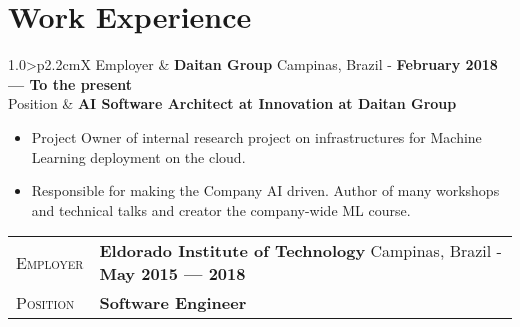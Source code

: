 \documentclass[9pt, a4paper, oneside, final]{scrartcl} %
\newcommand{\gray}{\rowcolor[gray]{.90}} %
\begin{document}


\section{Work Experience}

\begin{center}
\begin{tabularx}{1.0\linewidth}{>{\raggedleft\scshape}p{2.2cm}X}
\gray Employer & \textbf{Daitan Group} \hfill Campinas, Brazil - \textbf{February 2018 --- To the present}\\
\gray Position & \textbf{AI Software Architect at Innovation at Daitan Group}\\
\end{tabularx}
\end{center}

\begin{itemize}\itemsep1.0pt \parskip1.5pt 
\item Project Owner of internal research project on infrastructures for Machine Learning deployment on the cloud.
\item Responsible for making the Company AI driven. Author of many workshops and technical talks and creator the company-wide ML course.  
\end{itemize}

\begin{center}
\begin{tabularx}{1.0\linewidth}{>{\raggedleft\scshape}p{2.2cm}X}
\gray Employer & \textbf{Eldorado Institute of Technology} \hfill Campinas, Brazil - \textbf{May 2015 --- 2018}\\
\gray Position & \textbf{Software Engineer}\\
\end{tabularx}
\end{center}
\end{document}
